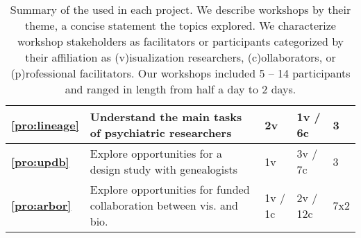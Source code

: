 \begin{table}
\begin{tabular}{|lp{4cm}lll|}
        \hline
        {\bf \ref{pro:lineage}} & Understand the main tasks of psychiatric researchers & 2v & 1v / 6c & 3  \\
        \hline
        {\bf \ref{pro:updb}} & Explore opportunities for a design study with genealogists & 1v & 3v / 7c  & 3 \\
        \hline
        {\bf \ref{pro:arbor}} & Explore opportunities for funded collaboration between vis. and bio. & 1v / 1c & 2v / 12c & 7x2 \\
        \hline
    \end{tabular}
    \caption{Summary of the \workshop used in each project. We describe workshops by their theme, a concise statement the topics explored. We characterize workshop stakeholders as facilitators or participants categorized by their affiliation as (v)isualization researchers, (c)ollaborators, or (p)rofessional facilitators. Our workshops included 5 -- 14 participants and ranged in length from half a day to 2 days.}
    \label{tab:workshops}
\end{table}